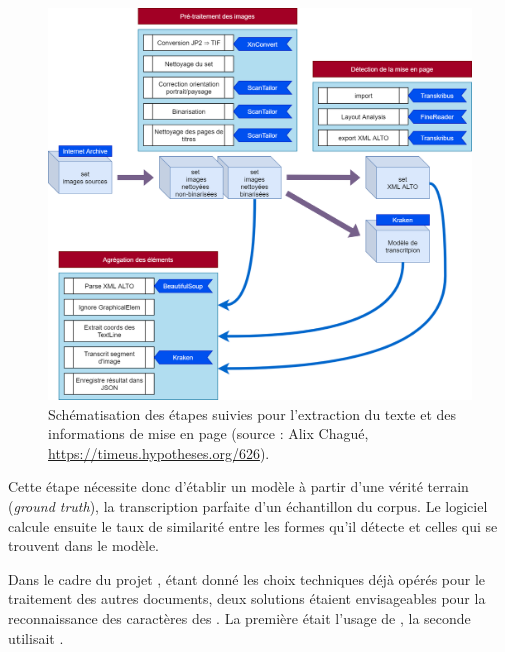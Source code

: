 \begin{figure}[t]
    \centering
    \includegraphics[width=15cm]{img/schema_lse_od2m.png}
    \caption{Schématisation des étapes suivies pour l’extraction du texte et des informations de mise en page (source : Alix Chagué, \url{https://timeus.hypotheses.org/626}).}
    \label{fig:schema_lse_od2m}
\end{figure}

Cette étape nécessite donc d'établir un modèle à partir d'une \og vérité terrain \fg{} (\textit{ground truth}), \cad{} la transcription parfaite d'un échantillon du corpus. Le logiciel calcule ensuite le taux de similarité entre les formes qu'il détecte et celles qui se trouvent dans le modèle.

Dans le cadre du projet \timeus, étant donné les choix techniques déjà opérés pour le traitement des autres documents, deux solutions étaient envisageables pour la reconnaissance des caractères des \odm. La première était l'usage de \transkribus{}, la seconde utilisait \kraken{}.

